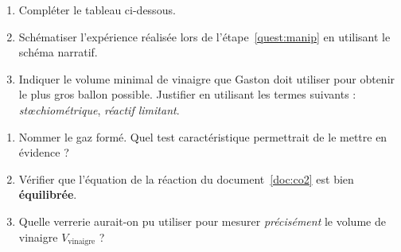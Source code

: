 \documentclass[12pt,a4paper,fleqn]{article}
\begin{document}
\begin{appel}
\rea{}
\end{appel}

\begin{enumerate}[resume]
\item \rea{}

Compléter le tableau ci-dessous.

\item \rea{}

Schématiser l'expérience réalisée lors de l'étape~\ref{quest:manip} en utilisant le schéma narratif.

\item \app{} \val{} \com{}

Indiquer le volume minimal de vinaigre que Gaston doit utiliser pour obtenir le plus gros ballon possible.
Justifier en utilisant les termes suivants : \emph{stœchiométrique}, \emph{réactif limitant}.
\end{enumerate}
\begin{appel}
\com{}
\end{appel}

\begin{enumerate}[resume]
\item \rco{}

Nommer le gaz formé.
Quel test caractéristique permettrait de le mettre en évidence ?

\item \anarai{}

Vérifier que l'équation de la réaction du document~\ref{doc:co2} est bien \textbf{équilibrée}.
\thumbsup

\item \val{}

Quelle verrerie aurait-on pu utiliser pour mesurer \emph{précisément} le volume de vinaigre $V_\mathrm{vinaigre}$ ?

\end{enumerate}
\end{document}
